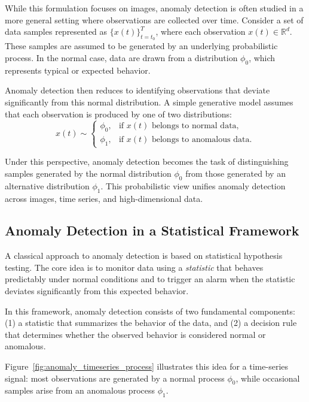 \documentclass{article}
\begin{document}
While this formulation focuses on images, anomaly detection is often studied in a 
more general setting where observations are collected over time. Consider a set of 
data samples represented as $\{x(t)\}_{t=t_0}^{T}$, where each observation 
$x(t) \in \mathbb{R}^d$. These samples are assumed to be generated by an underlying 
probabilistic process. In the normal case, data are drawn from a distribution 
$\phi_0$, which represents typical or expected behavior.

Anomaly detection then reduces to identifying observations that deviate 
significantly from this normal distribution. A simple generative model assumes that 
each observation is produced by one of two distributions:
\begin{equation}
  x(t) \sim
  \begin{cases}
    \phi_0, & \text{if $x(t)$ belongs to normal data},\\
    \phi_1, & \text{if $x(t)$ belongs to anomalous data}.
  \end{cases}
\end{equation}

Under this perspective, anomaly detection becomes the task of distinguishing 
samples generated by the normal distribution $\phi_0$ from those generated by an 
alternative distribution $\phi_1$. This probabilistic view unifies anomaly detection 
across images, time series, and high-dimensional data.

\subsection{Anomaly Detection in a Statistical Framework}

A classical approach to anomaly detection is based on statistical hypothesis
testing. The core idea is to monitor data using a \emph{statistic} that behaves
predictably under normal conditions and to trigger an alarm when the statistic
deviates significantly from this expected behavior.

In this framework, anomaly detection consists of two fundamental components:
(1) a statistic that summarizes the behavior of the data, and  
(2) a decision rule that determines whether the observed behavior is considered
normal or anomalous.

Figure~\ref{fig:anomaly_timeseries_process} illustrates this idea for a
time-series signal: most observations are generated by a normal process
$\phi_0$, while occasional samples arise from an anomalous process $\phi_1$.
\end{document}
